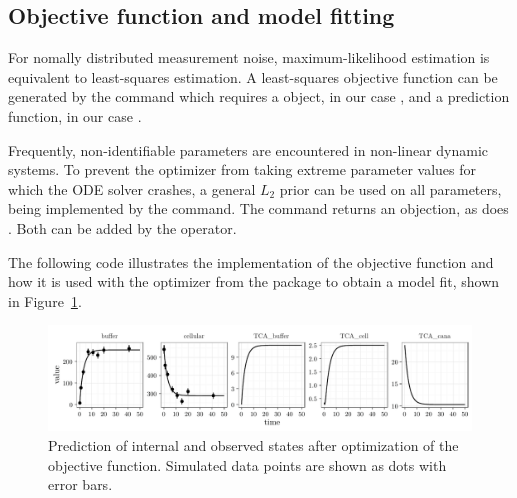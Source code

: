 \documentclass[article]{jss}
\begin{document}
\subsection{Objective function and model fitting}
For nomally distributed measurement noise, maximum-likelihood estimation is equivalent to least-squares estimation. A least-squares objective function can be generated by the  command which requires a  object, in our case , and a prediction function, in our case .

Frequently, non-identifiable parameters are encountered in non-linear dynamic systems. To prevent the optimizer from taking extreme parameter values for which the ODE solver crashes, a general $L_2$ prior can be used on all parameters, being implemented by the  command. The command returns an  objection, as does . Both can be added by the  operator.

The following code illustrates the implementation of the objective function and how it is used with the  optimizer from the  package to obtain a model fit, shown in Figure~\ref{fig:myfit}.

\begin{CodeChunk}
\end{CodeChunk}


\begin{figure}[ht]
	\centering
	\includegraphics[width = \textwidth]{images/figure4}
	\caption{Prediction of internal and observed states after optimization of the objective function. Simulated data points are shown as dots with error bars.}
	\label{fig:myfit}
\end{figure}
\end{document}
